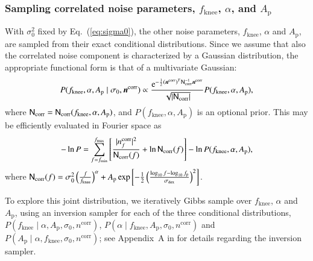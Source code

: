 \documentclass{aa}
\begin{document}
\subsubsection{Sampling correlated noise parameters, $f_\mathrm{knee}$, $\alpha$, and $A_\mathrm{p}$}

With $\sigma_0^2$ fixed by Eq.~(\ref{eq:sigma0}), the other noise
parameters, $f_\mathrm{knee}$, $\alpha$ and $A_\mathrm{p}$, are sampled from their
exact conditional distributions. Since we assume that also the
correlated noise component is characterized by a Gaussian distribution, the appropriate
functional form is that of a multivariate Gaussian:
\begin{equation}
        P(f_\mathrm{knee},\alpha, A_\mathrm{p}\mid\sigma_0, \boldsymbol{n}^\mathrm{corr})
        \propto \frac{\mathrm e^{-\frac{1}{2}(\boldsymbol{n}^\mathrm{corr})^T
            \mathsf{N}_\mathrm{corr}^{-1}\boldsymbol{n}^\mathrm{corr}}}{\sqrt{|\mathsf{N}_\mathrm{corr}|}}
        P(f_\mathrm{knee},\alpha, A_\mathrm{p}),
\end{equation}
where $\mathsf{N}_{\mathrm{corr}} = \mathsf{N}_\mathrm{corr}(f_\mathrm{knee},\alpha, A_\mathrm{p})$, and
$P(f_\mathrm{knee},\alpha, A_\mathrm{p})$ is an optional prior. This may be
efficiently evaluated in Fourier space as
\begin{equation}\label{eq:logP_S}
        -\ln P = \sum_{f=f_{\mathrm{min}}}^{f_{\mathrm{max}}}
        \left[\frac{|n_f^\mathrm{corr}|^2}{\mathsf{N}_\mathrm{corr}(f)}
          + \ln{\ensuremath{\mathsf{N}}_\mathrm{corr}(f)}\right] - \ln P(f_\mathrm{knee},\alpha, A_\mathrm{p}),
\end{equation}
where $\mathsf{N}_\mathrm{corr}(f) = \sigma_0^2 \left(\frac{f}{f_\mathrm{knee}}\right)^\alpha + A_\mathrm{p} \exp\left[-\frac{1}{2}\left(\frac{\log_{10}f - \log_{10} f_\mathrm{p}}{\sigma_\mathrm{dex}}\right)^2\right]$.

To explore this joint distribution, we iteratively Gibbs sample over
$f_\mathrm{knee}$, $\alpha$ and $A_\mathrm{p}$, using an inversion sampler for
each of the three conditional distributions, $P(f_\mathrm{knee}\mid\alpha, A_\mathrm{p},\sigma_0, n^\mathrm{corr})$, $P(\alpha\mid f_\mathrm{knee}, A_\mathrm{p}, \sigma_0, n^\mathrm{corr})$ and $P(A_\mathrm{p}\mid \alpha, f_\mathrm{knee}, \sigma_0, n^\mathrm{corr})$; see
Appendix~A in \citet{bp01} for details regarding the inversion
sampler.
\end{document}
